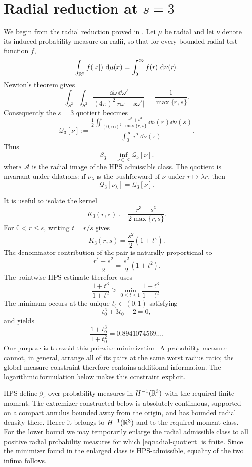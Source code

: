 \section{Radial reduction at $s=3$}\label{sec:radial}

We begin from the radial reduction proved in \cite{HPS2025}.  Let $\mu$ be radial and let $\nu$ denote its induced probability measure on radii, so that for every bounded radial test function $f$,
\[
 \int_{\mathbb{R}^3}f(|x|)\,\,\mathrm{d}\mu(x)
 =\int_0^\infty f(r)\,\,\mathrm{d}\nu(r).
\]
Newton's theorem gives
\[
 \int_{S^2}\int_{S^2}
 \frac{\dd\omega\,\dd\omega'}{(4\pi)^2|r\omega-s\omega'|}
 =\frac1{\max\{r,s\}}.
\]
Consequently the $s=3$ quotient becomes
\begin{equation}\label{eq:radial-quotient}
 \mathcal Q_3[\nu]
 :=
 \frac{\displaystyle
 \frac12\iint_{(0,\infty)^2}
 \frac{r^3+s^3}{\max\{r,s\}}\,\dd\nu(r)\dd\nu(s)}
 {\displaystyle\int_0^\infty r^2\,\dd\nu(r)}.
\end{equation}
Thus
\[
 \beta_3=\inf_{\nu\in\mathcal A}\mathcal Q_3[\nu].
\]
where $\mathcal A$ is the radial image of the HPS admissible class.  The quotient is invariant under dilations: if $\nu_\lambda$ is the pushforward of $\nu$ under $r\mapsto\lambda r$, then
\[
 \mathcal Q_3[\nu_\lambda]=\mathcal Q_3[\nu].
\]

It is useful to isolate the kernel
\[
 K_3(r,s):=\frac{r^3+s^3}{2\max\{r,s\}}.
\]
For $0<r\le s$, writing $t=r/s$ gives
\[
 K_3(r,s)=\frac{s^2}{2}(1+t^3).
\]
The denominator contribution of the pair is naturally proportional to
\[
 \frac{r^2+s^2}{2}=\frac{s^2}{2}(1+t^2).
\]
The pointwise HPS estimate therefore uses
\[
 \frac{1+t^3}{1+t^2}\ge\min_{0\le t\le1}\frac{1+t^3}{1+t^2}.
\]
The minimum occurs at the unique $t_0\in(0,1)$ satisfying
\[
 t_0^3+3t_0-2=0,
\]
and yields
\[
 \frac{1+t_0^3}{1+t_0^2}=0.8941074569\ldots .
\]
Our purpose is to avoid this pairwise minimization.  A probability measure cannot, in general, arrange all of its pairs at the same worst radius ratio; the global measure constraint therefore contains additional information.  The logarithmic formulation below makes this constraint explicit.

\begin{remark}[Admissibility]
HPS define $\beta_s$ over probability measures in $H^{-1}(\mathbb{R}^3)$ with the required finite moment.  The extremizer constructed below is absolutely continuous, supported on a compact annulus bounded away from the origin, and has bounded radial density there.  Hence it belongs to $H^{-1}(\mathbb{R}^3)$ and to the required moment class.  For the lower bound we may temporarily enlarge the radial admissible class to all positive radial probability measures for which \eqref{eq:radial-quotient} is finite.  Since the minimizer found in the enlarged class is HPS-admissible, equality of the two infima follows.
\end{remark}
